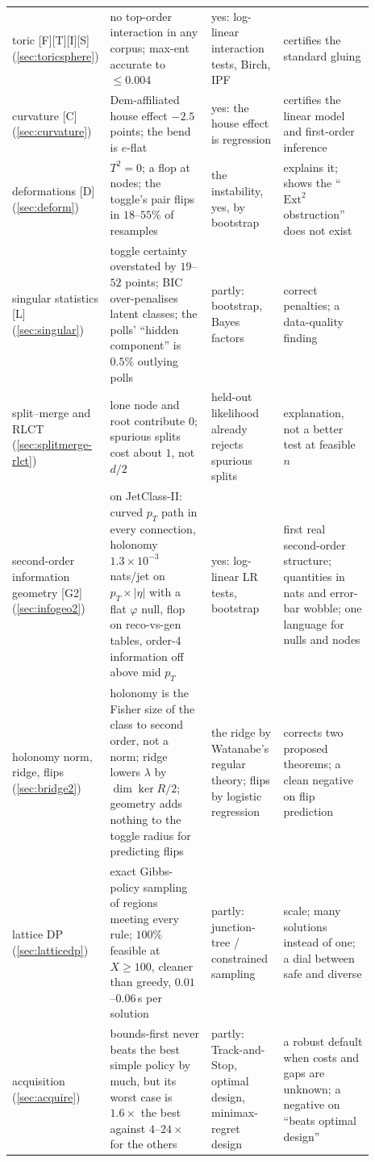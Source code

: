 \documentclass[11pt]{article}
\theoremstyle{definition}
\theoremstyle{remark}
\begin{document}
{\begin{longtable}{>{\raggedright\arraybackslash}p{0.15\linewidth}>{\raggedright\arraybackslash}p{0.29\linewidth}>{\raggedright\arraybackslash}p{0.2\linewidth}>{\raggedright\arraybackslash}p{0.25\linewidth}}
toric [F][T][I][S] (\ref{sec:toricsphere}) & no top-order interaction in any corpus; max-ent accurate to $\le0.004$ & yes: log-linear interaction tests, Birch, IPF & certifies the standard gluing\\
curvature [C] (\ref{sec:curvature}) & Dem-affiliated house effect $-2.5$ points; the bend is $e$-flat & yes: the house effect is regression & certifies the linear model and first-order inference\\
deformations [D] (\ref{sec:deform}) & $T^2=0$; a flop at nodes; the toggle's pair flips in $18$--$55\%$ of resamples & the instability, yes, by bootstrap & explains it; shows the ``$\mathrm{Ext}^2$ obstruction'' does not exist\\
singular statistics [L] (\ref{sec:singular}) & toggle certainty overstated by $19$--$52$ points; BIC over-penalises latent classes; the polls' ``hidden component'' is $0.5\%$ outlying polls & partly: bootstrap, Bayes factors & correct penalties; a data-quality finding\\
split--merge and RLCT (\ref{sec:splitmerge-rlct}) & lone node and root contribute $0$; spurious splits cost about $1$, not $d/2$ & held-out likelihood already rejects spurious splits & explanation, not a better test at feasible $n$\\
second-order information geometry [G2] (\ref{sec:infogeo2}) & on JetClass-II: curved $p_T$ path in every connection, holonomy $1.3\times10^{-3}$ nats/jet on $p_T\times|\eta|$ with a flat $\varphi$ null, flop on reco-vs-gen tables, order-4 information off above mid $p_T$ & yes: log-linear LR tests, bootstrap & first real second-order structure; quantities in nats and error-bar wobble; one language for nulls and nodes\\
holonomy norm, ridge, flips (\ref{sec:bridge2}) & holonomy is the Fisher size of the class to second order, not a norm; ridge lowers $\lambda$ by $\dim\ker R/2$; geometry adds nothing to the toggle radius for predicting flips & the ridge by Watanabe's regular theory; flips by logistic regression & corrects two proposed theorems; a clean negative on flip prediction\\
lattice DP (\ref{sec:latticedp}) & exact Gibbs-policy sampling of regions meeting every rule; $100\%$ feasible at $X\ge100$, cleaner than greedy, $0.01$--$0.06$\,s per solution & partly: junction-tree / constrained sampling & scale; many solutions instead of one; a dial between safe and diverse\\
acquisition (\ref{sec:acquire}) & bounds-first never beats the best simple policy by much, but its worst case is $1.6\times$ the best against $4$--$24\times$ for the others & partly: Track-and-Stop, optimal design, minimax-regret design & a robust default when costs and gaps are unknown; a negative on ``beats optimal design''\\

\end{longtable}}
\end{document}
